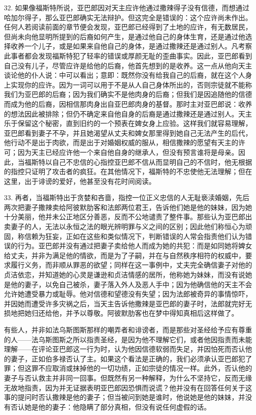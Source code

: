 32. 如果像福斯特所说，亚巴郎因对天主应许他通过撒辣得子没有信德，而想通过哈加尔得子，那么亚巴郎确实无法辩护。但这完全是错误的：这个应许尚未作出。任何人若阅读前面的章节便会发现，亚巴郎已经得到了土地的应许，有无数居民，但尚未向他显明所提到的后裔如何产生，是通过他自己的身体生育，还是通过他选择收养一个儿子，或是如果来自他自己的身体，是通过撒辣还是通过别人。凡考察此事者都会发现福斯特犯了轻率的错误或厚颜无耻的歪曲事实。因此，亚巴郎看到自己没有儿子，尽管应许是给他的后裔，他首先想到的是收养。这一点从他向天主谈论他的仆人说：中可以看出；意即：既然你没有给我自己的后裔，就在这个人身上实现你的应许。因为一词可以用于不是从人自己身体所出的，否则宗徒就不能称我们为亚巴郎的后裔；因为我们确实不是他肉身的后裔；但我们是因追随他的信德而成为他的后裔，因相信那肉身出自亚巴郎肉身的基督。那时主对亚巴郎说：收养的想法因此被排除；但仍不确定来自他自身的后裔是通过撒辣还是通过别人。天主乐于保留这个秘密，直到旧约的一个预表在婢女身上应验。这样我们就容易理解，亚巴郎看到妻子不孕，并且她渴望从丈夫和婢女那里得到她自己无法产生的后代，他行动不是出于肉欲，而是出于对婚姻权威的服从，相信撒辣的愿望有天主的许可；因为天主已经应许他一个来自他自身的继承人，但没有预言谁将是母亲。因此，当福斯特以自己不忠信的心指控亚巴郎不信从而显明自己的不信时，他无根据的指控只证明了攻击者的疯狂。在其他情况下，福斯特的不忠使他无法理解；但在这里，出于诽谤的爱好，他甚至没有花时间阅读。\par

33. 再者，当福斯特出于贪婪和吝啬，指控一位正义忠信的人无耻亵渎婚姻，先后两次把妻子撒辣卖给阿彼默肋客和法郎两位君王，告诉他们她是他的妹妹，因为她十分美丽，他并未公正地区分善恶，反而不公地谴责了整件事。那些认为亚巴郎出卖妻子的人，无法以永恒之法的眼光辨明罪与义之间的区别；因此他们称恒心为顽固，称信赖为狂妄，正如在这些和类似情况下，判断错误的人常会指责他们认为错误的行为。亚巴郎并没有通过把妻子卖给他人而成为她的共犯：而是如同她将婢女给丈夫，并非为满足他的情欲，而是为了子嗣，并在与自然秩序相符的权威中，要求履行义务，而非顺从罪恶的欲望；同样在这一事例中，丈夫完全确信妻子对他的贞洁依恋，并知道她的心灵是谦逊和贞洁情感的居所，他称她为妹妹，而没有说她是他的妻子，以免自己被杀，妻子落入外人及恶人手中；因为他确信他的天主不会允许她遭受暴力或耻辱。他对信德和望德没有失望；因为法郎被奇异的事情惊吓，并因她而遭受许多灾祸之后，当天主告诉他撒辣是亚巴郎的妻子时，法郎就完好无损地把她归还给他，并予以尊敬。阿彼默肋客也在梦中得知真相后这样做了。\par

有些人，并非如法乌斯图斯那样的嘲弄者和诽谤者，而是那些对圣经给予应有尊重的人——法乌斯图斯之所以指责圣经，是因为他不理解它们，或者他因指责而未能理解——在评论亚巴郎这一行为时，认为他因信德软弱而失足，并因怕死而否认他的妻子，正如伯多禄否认了主。如果这个看法是正确的，我们必须承认亚巴郎犯了罪；但这罪不应取消或抹掉他的一切功绩，正如宗徒的情况一样。此外，否认他的妻子与否认救主并非同一回事。但既然有另一种解释，为什么不坚持它，反而无缘无故地指责，因为并无证据表明亚巴郎因恐惧而说谎？他并没有在回答任何关于这事的提问时否认撒辣是他的妻子；但当被问到她是谁时，他说她是他的妹妹，并没有否认她是他的妻子：他隐瞒了部分真相，但没有说任何虚假的话。\par

